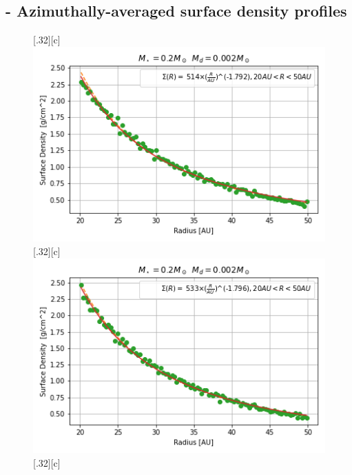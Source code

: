 \documentclass[aps,prb,twocolumn,superscriptaddress,floatfix,longbibliography]{revtex4-2}
\begin{document}
\clearpage
\begin{appendices}
\onecolumngrid

\section{- Azimuthally-averaged surface density profiles}\label{app:appendixA}
\begin{figure}[!htbp]\vspace*{4cm}
  \centering
    \subcaptionbox*{}[.32\linewidth][c]{%
    \includegraphics[width=\linewidth]{Graphs_1D/r_0.2s_0.002d_0.3q_1D.png}}\quad
    \vspace{-2\baselineskip}
  \subcaptionbox*{}[.32\linewidth][c]{%
    \includegraphics[width=\linewidth]{Graphs_1D/r_0.2s_0.002d_0.5q_1D.png}}\quad
  \subcaptionbox*{}[.32\linewidth][c]{%
}
\end{figure}
\end{appendices}
\end{document}
